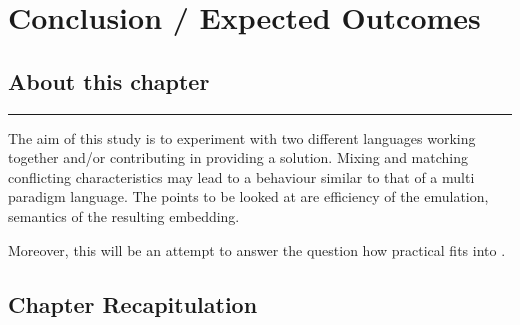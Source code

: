 \documentclass[thesis-solanki.tex]{subfiles}
\begin{document}
\chapter{Conclusion / Expected Outcomes}\label{chap:conclusion}


\section{About this chapter}

\noindent\rule{\textwidth}{0.5pt}


\begin{comment}
As we have seen there have been a number of attempts at solving the problem and so have been the issues. First and foremost, with appropriate  documentation the resulting library should be easy to use. Writing a program must be very much the same as writing a program in the host language. With the introduction of few new constructs defining
\end{comment}

The aim of this study is to experiment with two different languages working together and/or contributing in providing a solution. Mixing and matching conflicting characteristics may lead to a behaviour similar to that of a multi paradigm language. The points to be looked at are efficiency of the emulation, semantics of the resulting embedding.

Moreover, this will be an attempt to answer the question how practical  fits into .                  


\section{Chapter Recapitulation}

\ifMain
\begin{scope}
  \nolinenumbers
  \enotesize
  \par
  \begin{singlespace}
  \setlength{\parskip}{12pt plus 2pt minus 1pt}
  \theendnotes
  \par
  \end{singlespace}
\end{scope}
\fi
\end{document}
